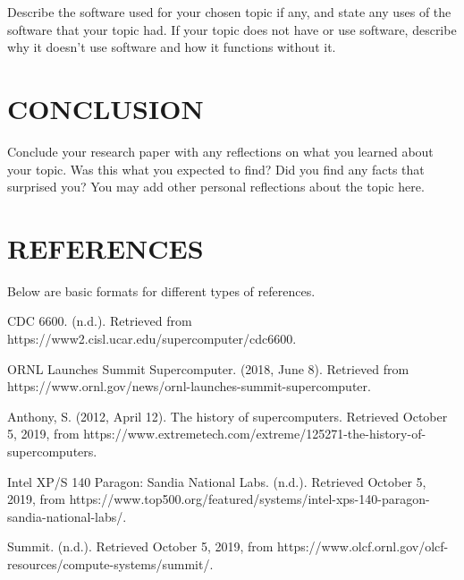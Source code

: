 \documentclass[letterpaper, 10 pt, conference]{IEEEconf}
\begin{document}
Describe the software used for your chosen topic if any,
and state any uses of the software that your topic had.
If your topic does not have or use software, describe why it
doesn't use software and how it functions without it.

\section{CONCLUSION}

Conclude your research paper with any reflections on what you
learned about your topic. Was this what you expected to find?
Did you find any facts that surprised you? You may add other
personal reflections about the topic here.

\section*{REFERENCES}

Below are basic formats for different types of references.

\begin{enumerate}[label={[\arabic*]}]
\item CDC 6600. (n.d.). Retrieved from
https://www2.cisl.ucar.edu/supercomputer/cdc6600.
\item ORNL Launches Summit Supercomputer. (2018, June 8).
Retrieved from 
https://www.ornl.gov/news/ornl-launches-summit-supercomputer.
\item Anthony, S. (2012, April 12). The history of supercomputers. Retrieved October 5, 2019, from https://www.extremetech.com/extreme/125271-the-history-of-supercomputers.
\item Intel XP/S 140 Paragon: Sandia National Labs. (n.d.). Retrieved October 5, 2019, from https://www.top500.org/featured/systems/intel-xps-140-paragon-sandia-national-labs/.
\item Summit. (n.d.). Retrieved October 5, 2019, from https://www.olcf.ornl.gov/olcf-resources/compute-systems/summit/.
\end{enumerate}
\end{document}
